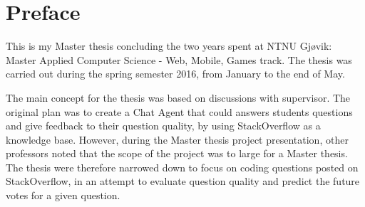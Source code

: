 \hypersetup{pageanchor=false}
%

\chapter*{Preface}
This is my Master thesis concluding the two years spent at NTNU Gjøvik: Master Applied Computer Science - Web, Mobile, Games track. 
The thesis was carried out during the spring semester 2016, from January to the end of May. 

The main concept for the thesis was based on discussions with supervisor. The original plan was to create a Chat Agent that could answers students questions and give feedback 
to their question quality, by using StackOverflow as a knowledge base. However, during the Master thesis project presentation, other professors noted that the scope of the 
project was to large for a Master thesis. The thesis were therefore narrowed down to focus on coding questions posted on StackOverflow, in an attempt to evaluate question quality 
and predict the future votes for a given question. 

\thesisdate \\[1pc]
\\[1pc]
